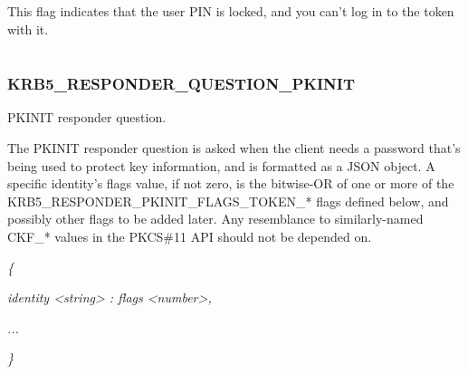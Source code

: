 \documentclass[letterpaper,10pt,english]{sphinxmanual}
\begin{document}
\begin{fulllineitems}
\label{appdev/refs/macros/KRB5_RESPONDER_PKINIT_FLAGS_TOKEN_USER_PIN_LOCKED:KRB5_RESPONDER_PKINIT_FLAGS_TOKEN_USER_PIN_LOCKED}
\end{fulllineitems}


This flag indicates that the user PIN is locked, and you can't log in to the token with it.

\begin{tabulary}{\linewidth}{|L|L|}
\hline

 & 
\\\hline
\end{tabulary}



\subsubsection{KRB5\_RESPONDER\_QUESTION\_PKINIT}
\label{appdev/refs/macros/KRB5_RESPONDER_QUESTION_PKINIT:krb5-responder-question-pkinit}\label{appdev/refs/macros/KRB5_RESPONDER_QUESTION_PKINIT:krb5-responder-question-pkinit-data}\label{appdev/refs/macros/KRB5_RESPONDER_QUESTION_PKINIT::doc}

\begin{fulllineitems}
\label{appdev/refs/macros/KRB5_RESPONDER_QUESTION_PKINIT:KRB5_RESPONDER_QUESTION_PKINIT}
\end{fulllineitems}


PKINIT responder question.

The PKINIT responder question is asked when the client needs a password that's being used to protect key information, and is formatted as a JSON object. A specific identity's flags value, if not zero, is the bitwise-OR of one or more of the KRB5\_RESPONDER\_PKINIT\_FLAGS\_TOKEN\_* flags defined below, and possibly other flags to be added later. Any resemblance to similarly-named CKF\_* values in the PKCS\#11 API should not be depended on.

\emph{\{}

\emph{identity \textless{}string\textgreater{} : flags \textless{}number\textgreater{},}

\emph{...}

\emph{\}}
\end{document}
